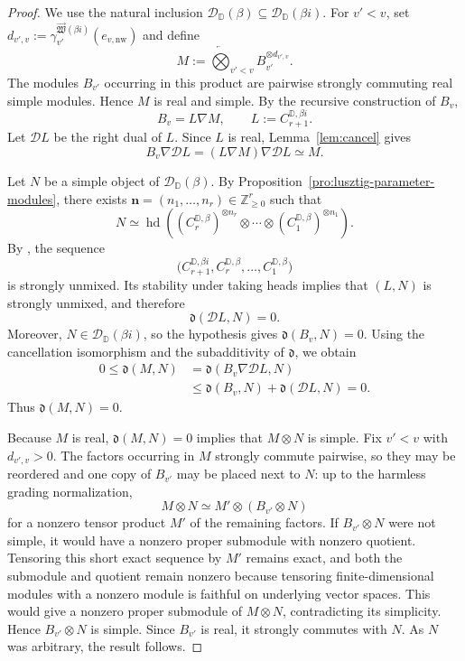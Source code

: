 \documentclass[12pt, reqno]{amsart}
\theoremstyle{plain}
\theoremstyle{definition}
\numberwithin{equation}{section}
\newcommand{\ZZ}{\mathbb{Z}}
\newcommand{\DD}{\mathbb{D}}
\begin{document}
\begin{proof}
We use the natural inclusion
\(
    \mathscr D_{\DD}(\beta)
    \subseteq
    \mathscr D_{\DD}(\beta i).
\)
For \(v'<v\), set
\(
    d_{v',v}
    :=
    \gamma_{v'}^{\overrightarrow{\mathfrak W}(\beta i)}
    (e_{v,\mathrm{nw}})
\)
and define
\[
    M
    :=
    \overleftarrow{\bigotimes}_{v'<v}
    B_{v'}^{\otimes d_{v',v}}.
\]
The modules \(B_{v'}\) occurring in this product are pairwise strongly
commuting real simple modules. Hence \(M\) is real and simple. By the
recursive construction of \(B_v\),
\[
    B_v=L\nabla M,
    \qquad
    L:=C_{r+1}^{\DD,\beta i}.
\]
Let \(\mathcal DL\) be the right dual of \(L\). Since \(L\) is real,
Lemma~\ref{lem:cancel} gives
\[
    B_v\nabla\mathcal DL
    =
    (L\nabla M)\nabla\mathcal DL
    \simeq M.
\]

Let \(N\) be a simple object of \(\mathscr D_{\DD}(\beta)\). By Proposition~\ref{pro:lusztig-parameter-modules}, there exists
\(\mathbf n=(n_1,\ldots,n_r)\in\ZZ_{\geq0}^r\) such that
\[
    N
    \simeq
    \operatorname{hd}\left(
        (C_r^{\DD,\beta})^{\otimes n_r}
        \otimes\cdots\otimes
        (C_1^{\DD,\beta})^{\otimes n_1}
    \right).
\]
By \cite[Theorem~5.16]{kashiwara2025monoidal}, the sequence
\[
    \bigl(
        C_{r+1}^{\DD,\beta i},
        C_r^{\DD,\beta},\ldots,C_1^{\DD,\beta}
    \bigr)
\]
is strongly unmixed. Its stability under taking heads
\cite[Proposition~1.14]{kashiwara2025monoidal} implies that
\((L,N)\) is strongly unmixed, and therefore
\[
    \mathfrak d(\mathcal DL,N)=0.
\]
Moreover, \(N\in\mathscr D_{\DD}(\beta i)\), so the hypothesis gives
\(\mathfrak d(B_v,N)=0\). Using the cancellation isomorphism and the
subadditivity of \(\mathfrak d\), we obtain
\[
\begin{aligned}
    0
    \leq\mathfrak d(M,N)
    &=
    \mathfrak d(B_v\nabla\mathcal DL,N)\\
    &\leq
    \mathfrak d(B_v,N)
    +
    \mathfrak d(\mathcal DL,N)
    =
    0.
\end{aligned}
\]
Thus \(\mathfrak d(M,N)=0\).

Because \(M\) is real, \(\mathfrak d(M,N)=0\) implies that
\(M\otimes N\) is simple. Fix \(v'<v\) with
\(d_{v',v}>0\). The factors occurring in \(M\) strongly commute
pairwise, so they may be reordered and one copy of \(B_{v'}\) may be
placed next to \(N\): up to the harmless grading normalization,
\[
    M\otimes N\simeq M'\otimes(B_{v'}\otimes N)
\]
for a nonzero tensor product \(M'\) of the remaining factors.
If \(B_{v'}\otimes N\) were not simple, it would have a nonzero
proper submodule with nonzero quotient. Tensoring this short exact
sequence by \(M'\) remains exact, and both the submodule and quotient
remain nonzero because tensoring finite-dimensional modules with a
nonzero module is faithful on underlying vector spaces. This would
give a nonzero proper submodule of \(M\otimes N\), contradicting its
simplicity. Hence \(B_{v'}\otimes N\) is simple. Since \(B_{v'}\)
is real, it strongly commutes with \(N\). As \(N\) was arbitrary,
the result follows.
\end{proof}
\end{document}
